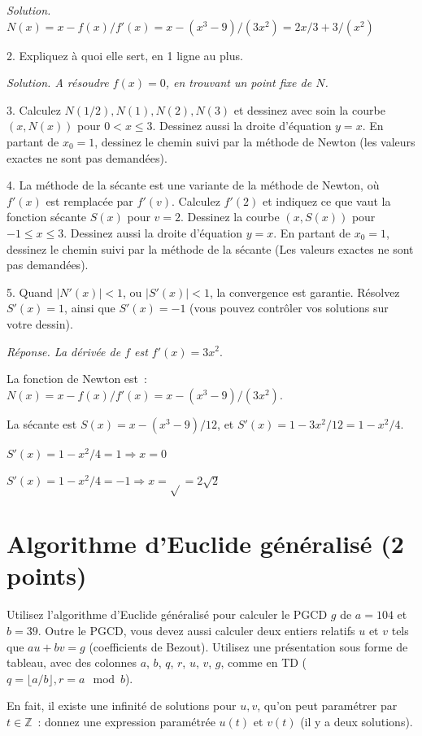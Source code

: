\documentclass[11pt]{article}
\def\Z{\mathbb Z}
\begin{document}
\ifcorrige
{\it Solution. $N(x)=x - f(x)/f'(x)= x - (x^3-9)/(3x^2)=2x/3 + 3/(x^2)$
}
\else\fi


2. Expliquez à quoi elle sert, en 1 ligne au plus.
 
\ifcorrige
{\it Solution. A résoudre $f(x)=0$, en trouvant un point fixe de $N$.
}
\else\fi

 


3.  Calculez $N(1/2), N(1), N(2), N(3)$ et dessinez   avec soin la courbe $(x, N(x))$ pour $0 < x \le 3$.
Dessinez aussi la droite d'équation $y=x$.
En partant de $x_0=1$, dessinez 
le chemin suivi par la méthode de Newton (les valeurs exactes ne sont pas demandées).
 
4. La méthode de la sécante est une variante de la méthode de Newton, où
$f'(x)$ est remplacée par $f'(v)$. Calculez $f'(2)$ et indiquez ce 
que vaut la fonction sécante $S(x)$ pour  $v=2$. 
Dessinez  la courbe $(x, S(x))$ pour $-1 \le x \le 3$.
Dessinez  aussi la droite d'équation $y=x$.
En partant de $x_0=1$, dessinez
le chemin suivi par la méthode de la sécante
(Les valeurs exactes ne sont pas demandées).
 
5. Quand $|N'(x)|< 1$, ou $|S'(x)| < 1$, la convergence est garantie. Résolvez
$S'(x)=1$, ainsi que $S'(x)= -1$ (vous pouvez  contrôler vos solutions sur votre dessin). 


\ifcorrige
{\it Réponse. La dérivée de $f$ est $f'(x)=3x^2.$

La fonction de Newton est~: $N(x)= x - f(x)/f'(x) = x - (x^3-9)/(3x^2)$.

La sécante est $S(x)= x - (x^3-9)/12$, et $S'(x)=1-3x^2/12=1-x^2/4$.

$S'(x)=1-x^2/4=1 \Rightarrow x=0$

$S'(x)=1-x^2/4=-1  \Rightarrow x =\sqrt{}=2\sqrt{2}$

}
\else
\fi

{
\section{Algorithme d'Euclide généralisé (2 points)}
Utilisez  l'algorithme d'Euclide généralisé
pour calculer le PGCD $g$ de $a=104$ et $b=39$. Outre le PGCD, vous devez
aussi calculer deux entiers relatifs $u$ et $v$ tels que $a u + b v=g$ (coefficients de Bezout).
Utilisez une présentation sous forme de tableau, avec des colonnes $a$, $b$, $q$, $r$, $u$, $v$, $g$, comme en TD ($q=\lfloor a/b\rfloor, r=a \mod b$).

En fait, il existe une infinité de solutions pour $u, v$, qu'on peut paramétrer par $t\in \Z$~: donnez une expression paramétrée  $u(t)$ et $v(t)$ (il y a deux solutions).

}
\end{document}
